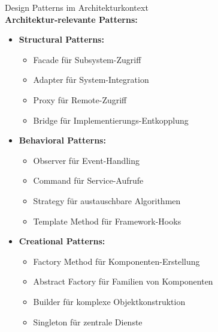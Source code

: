 \begin{concept}{Design Patterns im Architekturkontext}\\
    \small
\textbf{Architektur-relevante Patterns:}
\begin{itemize}
    \item \textbf{Structural Patterns:}
    \begin{itemize}
        \item Facade für Subsystem-Zugriff
        \item Adapter für System-Integration
        \item Proxy für Remote-Zugriff
        \item Bridge für Implementierungs-Entkopplung
    \end{itemize}
    
    \item \textbf{Behavioral Patterns:}
    \begin{itemize}
        \item Observer für Event-Handling
        \item Command für Service-Aufrufe
        \item Strategy für austauschbare Algorithmen
        \item Template Method für Framework-Hooks
    \end{itemize}
    
    \item \textbf{Creational Patterns:}
    \begin{itemize}
        \item Factory Method für Komponenten-Erstellung
        \item Abstract Factory für Familien von Komponenten
        \item Builder für komplexe Objektkonstruktion
        \item Singleton für zentrale Dienste
    \end{itemize}
\end{itemize}
\end{concept}


